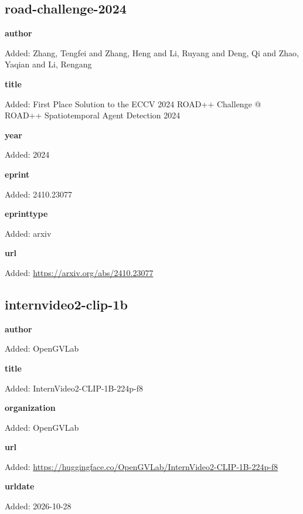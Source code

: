 \subsection*{road-challenge-2024}
\noindent{}\par
\noindent\textbf{author}\par
{\color{AuditGreen}Added: Zhang, Tengfei and Zhang, Heng and Li, Ruyang and Deng, Qi and Zhao, Yaqian and Li, Rengang\par}
\noindent\textbf{title}\par
{\color{AuditGreen}Added: First Place Solution to the ECCV 2024 ROAD++ Challenge @ ROAD++ Spatiotemporal Agent Detection 2024\par}
\noindent\textbf{year}\par
{\color{AuditGreen}Added: 2024\par}
\noindent\textbf{eprint}\par
{\color{AuditGreen}Added: 2410.23077\par}
\noindent\textbf{eprinttype}\par
{\color{AuditGreen}Added: arxiv\par}
\noindent\textbf{url}\par
{\color{AuditGreen}Added: \url{https://arxiv.org/abs/2410.23077}\par}
\medskip

\subsection*{internvideo2-clip-1b}
\noindent{}\par
\noindent\textbf{author}\par
{\color{AuditGreen}Added: OpenGVLab\par}
\noindent\textbf{title}\par
{\color{AuditGreen}Added: InternVideo2-CLIP-1B-224p-f8\par}
\noindent\textbf{organization}\par
{\color{AuditGreen}Added: OpenGVLab\par}
\noindent\textbf{url}\par
{\color{AuditGreen}Added: \url{https://huggingface.co/OpenGVLab/InternVideo2-CLIP-1B-224p-f8}\par}
\noindent\textbf{urldate}\par
{\color{AuditGreen}Added: 2026-10-28\par}
\medskip

